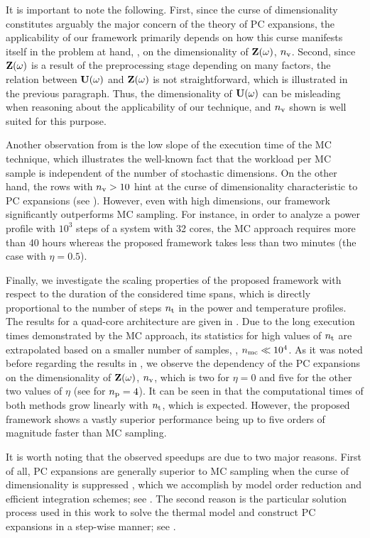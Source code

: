 It is important to note the following.
First, since the curse of dimensionality constitutes arguably the major concern of the theory of PC expansions, the applicability of our framework primarily depends on how this curse manifests itself in the problem at hand, \ie, on the dimensionality of $\mathbf{Z}(\omega)$, ${n_\text{v}}$.
Second, since $\mathbf{Z}(\omega)$ is a result of the preprocessing stage depending on many factors, the relation between $\mathbf{U}(\omega)$ and $\mathbf{Z}(\omega)$ is not straightforward, which is illustrated in the previous paragraph.
Thus, the dimensionality of $\mathbf{U}(\omega)$ can be misleading when reasoning about the applicability of our technique, and ${n_\text{v}}$ shown  is well suited for this purpose.

Another observation from  is the low slope of the execution time of the MC technique, which illustrates the well-known fact that the workload per MC sample is independent of the number of stochastic dimensions.
On the other hand, the rows with ${n_\text{v}} > 10$ hint at the curse of dimensionality characteristic to PC expansions (see ).
However, even with high dimensions, our framework significantly outperforms MC sampling. For instance, in order to analyze a power profile with $10^3$ steps of a system with 32 cores, the MC approach requires more than 40 hours whereas the proposed framework takes less than two minutes (the case with $\eta = 0.5$).

Finally, we investigate the scaling properties of the proposed framework with respect to the duration of the considered time spans, which is directly proportional to the number of steps ${n_\text{t}}$ in the power and temperature profiles.
The results for a quad-core architecture are given in .
Due to the long execution times demonstrated by the MC approach, its statistics for high values of ${n_\text{t}}$ are extrapolated based on a smaller number of samples, \ie, ${n_\text{mc}} \ll 10^4$.
As it was noted before regarding the results in , we observe the dependency of the PC expansions on the dimensionality of $\mathbf{Z}(\omega)$, ${n_\text{v}}$, which is two for $\eta = 0$ and five for the other two values of $\eta$ (see  for ${n_\text{p}} = 4$).
It can be seen in  that the computational times of both methods grow linearly with ${n_\text{t}}$, which is expected.
However, the proposed framework shows a vastly superior performance being up to five orders of magnitude faster than MC sampling.

It is worth noting that the observed speedups are due to two major reasons.
First of all, PC expansions are generally superior to MC sampling when the curse of dimensionality is suppressed \cite{xiu2010, eldred2008}, which we accomplish by model order reduction and efficient integration schemes; see .
The second reason is the particular solution process used in this work to solve the thermal model and construct PC expansions in a step-wise manner; see .
